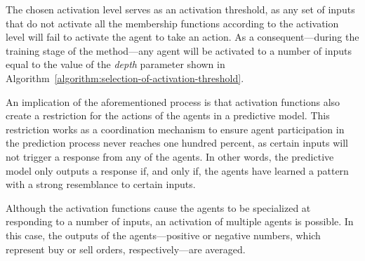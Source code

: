 ﻿\documentclass{ieeeaccess}
\begin{document}

The chosen activation level serves as an activation threshold, as any set of
inputs that do not activate all the membership functions according to the
activation level will fail to activate the agent to take an action. As a
consequent---during the training stage of the method---any agent will be
activated to a number of inputs equal to the value of the \textit{depth}
parameter shown in Algorithm~\ref{algorithm:selection-of-activation-threshold}.

An implication of the aforementioned process is that activation functions also
create a restriction for the actions of the agents in a predictive model. This
restriction works as a coordination mechanism to ensure agent participation in
the prediction process never reaches one hundred percent, as certain 
inputs will not trigger a response from any of the agents. In other words, the
predictive model only outputs a response if, and only if, the agents have learned
a pattern with a strong resemblance to certain inputs.

Although the activation functions cause the agents to be specialized at
responding to a number of inputs, an activation of multiple agents is
possible. %
In this case, the outputs of the agents---positive or negative
numbers, which represent buy or sell orders, respectively---are
averaged. %

\end{document}
